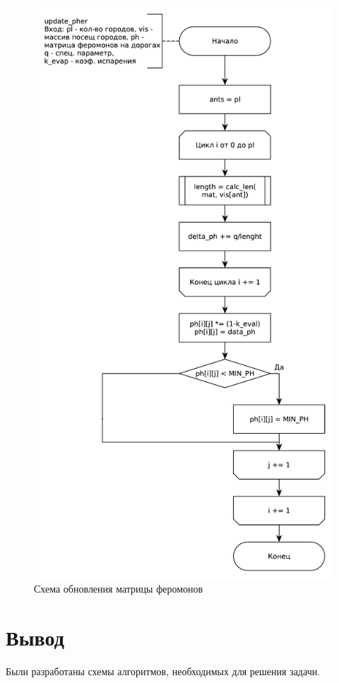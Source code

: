 \begin{figure}[ht!]
	\centering
	\includegraphics[width=0.750\linewidth]{assets/graphs/update_ph.pdf}
	\caption{Схема обновления матрицы феромонов}
	\label{fig:update_phero}
\end{figure}



\section*{Вывод}

Были разработаны схемы алгоритмов, необходимых для решения задачи.